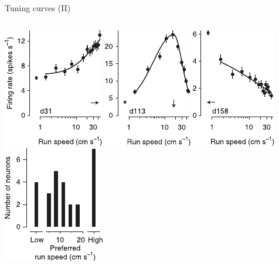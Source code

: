 \documentclass[handout,aspectratio=169]{beamer}
\begin{document}
\begin{frame}{Tuning curves (II)}
	\begin{columns}
		\includegraphics[scale=1.25]{media/saleem_et_al_tuning_curves_a.pdf}
		\includegraphics[scale=1.25]{media/saleem_et_al_tuning_curves_b.pdf}
		\includegraphics[scale=1.25]{media/saleem_et_al_tuning_curves_c.pdf}
		\includegraphics[scale=1.25]{media/saleem_et_al_tuning_curves_d.pdf}
	\end{columns}
\end{frame}
\end{document}
